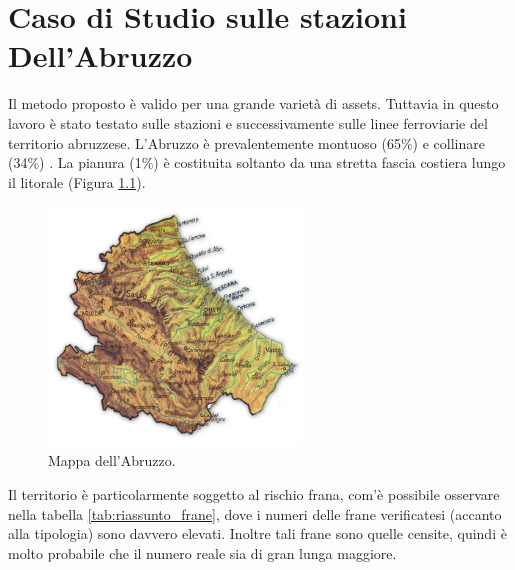 
\chapter{Caso di Studio sulle stazioni Dell'Abruzzo} %
Il metodo proposto è valido per una grande varietà di assets. Tuttavia in questo lavoro è stato testato sulle stazioni e successivamente sulle linee ferroviarie del territorio abruzzese. 
L'Abruzzo è prevalentemente montuoso (65\%) e collinare (34\%) \cite{abruzzo}. La pianura (1\%) è costituita soltanto da una stretta fascia costiera lungo il litorale (Figura \ref{abruzzo_map}).

\begin{figure}[h]
	\centering
	\includegraphics[width=0.6\textwidth]{images/abruzzo_disegno}
	\caption{Mappa dell'Abruzzo.}
	\label{abruzzo_map}
\end{figure}

Il territorio è particolarmente soggetto al rischio frana, com'è possibile osservare nella tabella \ref{tab:riassunto_frane}, dove i numeri delle frane verificatesi (accanto alla tipologia) sono davvero elevati. Inoltre tali frane sono quelle censite, quindi è molto probabile che il numero reale sia di gran lunga maggiore.

